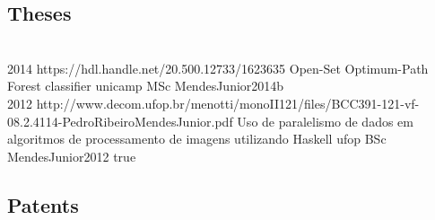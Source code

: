 
\subsection*{Theses}

\begin{publications}
  \\

  {2014}
  {https://hdl.handle.net/20.500.12733/1623635}
  {Open-Set Optimum-Path Forest classifier}
  {unicamp}
  {MSc}
  {MendesJunior2014b}
  {}
  \\

  {2012}
  {http://www.decom.ufop.br/menotti/monoII121/files/BCC391-121-vf-08.2.4114-PedroRibeiroMendesJunior.pdf}
  {Uso de paralelismo de dados em algoritmos de processamento de imagens utilizando Haskell}
  {ufop}
  {BSc}
  {MendesJunior2012}
  {true}
  \\

\end{publications}

\subsection*{Patents}

